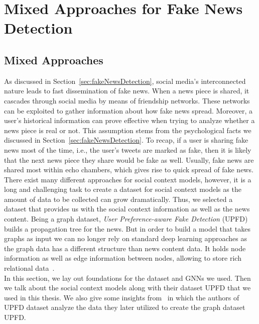 
\chapter{Mixed Approaches for Fake News Detection}\label{chapter:MixedApproachesForFND}

\section{Mixed Approaches}
\label{sec:mixedApproaches}
As discussed in Section~\ref{sec:fakeNewsDetection}, social media's interconnected nature leads to fast dissemination of
fake news. When a news piece is shared, it cascades through social media by means of friendship networks. These networks
can be exploited to gather information about how fake news spread. Moreover, a user's historical information can prove effective when trying to analyze whether a news piece is real or not. This assumption stems from the psychological facts we discussed in Section~\ref{sec:fakeNewsDetection}. To recap, if a user is sharing fake news most of the time, i.e., the user's tweets are marked as fake, then it is likely that the next news piece they share would be fake as well. Usually, fake news are shared most within echo chambers, which gives rise to quick spread of fake news.\\
There exist many different approaches for social context models, however, it is a long and challenging task to create a dataset for social context models as the amount of data to be collected can grow dramatically. Thus, we selected a dataset that provides us with the social context information as well as the news content. Being a graph dataset, \emph{User Preference-aware Fake Detection} (UPFD)~\parencite{UPFD_Dataset_Shu} builds a propagation tree for the news. But in order to build a model that takes graphs as input we can no longer rely on standard deep learning approaches as the graph data has a different structure than news content data. It holds node information as well as edge information between nodes, allowing to store rich relational data~\parencite{UPFD_Dataset_Shu}.\\
In this section, we lay out foundations for the dataset and GNNs we used. Then we talk about the social context models along with their dataset UPFD that we used in this thesis. We also give some insights from~\parencite{HierarchicalPropagationNetworksForFND_Shu} in which the authors of UPFD dataset analyze the data they later utilized to create the graph dataset UPFD.\\


